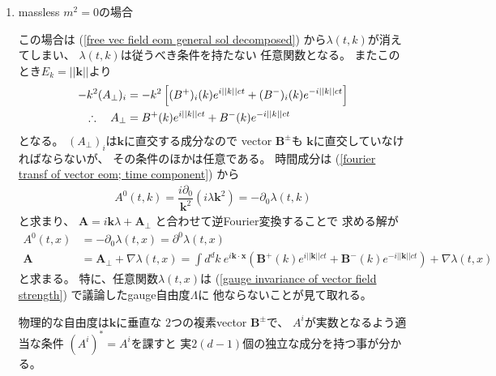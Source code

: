 \begin{enumerate}
\renewcommand{\labelenumi}{(\roman{enumi})}
\item {massless $m^2 = 0$の場合}

    この場合は
    (\ref{free vec field eom general sol decomposed})
    から$\lambda(t, k)$が消えてしまい、
    $\lambda(t, k)$は従うべき条件を持たない
    任意関数となる。
    またこのとき$E_k = ||\bm{k}||$より
    \begin{align}
        - k^2
        (A_\perp)_i
    &=
    - k^2
    \left[
        (B^+)_i (k) e^{i ||k|| c t}
    +
        (B^-)_i (k) e^{- i ||k|| c t}
    \right]
    \notag\\\therefore\quad
        A_\perp
    &=
        B^+ (k) e^{i ||k|| c t}
    +
        B^- (k) e^{- i ||k|| c t}
    \end{align}
    となる。
    $(A_\perp)_i$は$\bm{k}$に直交する成分なので
    vector $\bm{B}^\pm$も
    $\bm{k}$に直交していなければならないが、
    その条件のほかは任意である。
    時間成分は
    (\ref{fourier transf of vector eom; time component})
    から
    \begin{align}
        A^0 (t, k)
    =
        \dfrac{i \partial_0}
            {\bm{k}^2}
        (i \lambda \bm{k}^2)
    =
        - \partial_0 \lambda (t, k)
    \end{align}
    と求まり、
    $\bm{A}
    = i \bm{k} \lambda
        + \bm{A}_\perp$
    と合わせて逆Fourier変換することで
    求める解が
    \begin{subequations}
    \begin{align}
        A^0 (t, x)
    &=
        - \partial_0 \lambda (t, x)
    =
        \partial^0 \lambda (t, x)
    \\
        \bm{A}
    &=
        \bm{A}_\perp
    +
        \nabla \lambda(t, x)
    =
        \int d^d k\ 
        e^{i \bm{k} \cdot \bm{x}}
        \left(
            \bm{B}^+ (k) e^{i ||\bm{k}|| c t}
        +
            \bm{B}^- (k) e^{- i ||\bm{k}|| c t}
        \right)
    +
        \nabla \lambda(t, x)
    \end{align}
    \end{subequations}
    と求まる。
    特に、任意関数$\lambda(t, x)$は
    (\ref{gauge invariance of vector field strength})
    で議論したgauge自由度$\Lambda$に
    他ならないことが見て取れる。

    物理的な自由度は$\bm{k}$に垂直な
    $2$つの複素vector $\bm{B}^\pm$で、
    $A^i$が実数となるよう適当な条件
    $(A^i)^* = A^i$を課すと
    実$2(d-1)$個の独立な成分を持つ事が分かる。


\end{enumerate}
